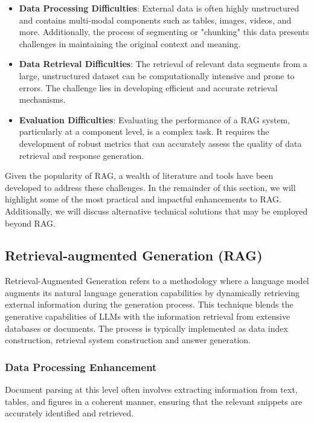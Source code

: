 \begin{itemize}
    \item \textbf{Data Processing Difficulties}: External data is often highly unstructured and contains multi-modal components such as tables, images, videos, and more. Additionally, the process of segmenting or "chunking" this data presents challenges in maintaining the original context and meaning.
    
    \item \textbf{Data Retrieval Difficulties}: The retrieval of relevant data segments from a large, unstructured dataset can be computationally intensive and prone to errors. The challenge lies in developing efficient and accurate retrieval mechanisms.
    
    \item \textbf{Evaluation Difficulties}: Evaluating the performance of a RAG system, particularly at a component level, is a complex task. It requires the development of robust metrics that can accurately assess the quality of data retrieval and response generation.
\end{itemize}

Given the popularity of RAG, a wealth of literature and tools have been developed to address these challenges. In the remainder of this section, we will highlight some of the most practical and impactful enhancements to RAG. Additionally, we will discuss alternative technical solutions that may be employed beyond RAG.

\subsection{Retrieval-augmented Generation (RAG)}

Retrieval-Augmented Generation refers to a methodology where a language model augments its natural language generation capabilities by dynamically retrieving external information during the generation process. This technique blends the generative capabilities of LLMs with the information retrieval from extensive databases or documents. The process is typically implemented as data index construction, retrieval system construction and answer generation.

\subsubsection{Data Processing Enhancement}

Document parsing at this level often involves extracting information from text, tables, and figures in a coherent manner, ensuring that the relevant snippets are accurately identified and retrieved.

